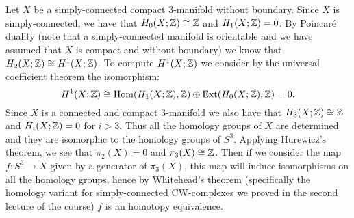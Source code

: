 \documentclass[a4paper,11pt,english]{article}
\begin{document}
\begin{exercise}[2]
Let $X$ be a simply-connected compact 3-manifold without boundary. Since $X$ is simply-connected, we have that $H_0(X;\mathbb{Z})\cong\mathbb{Z}$ and $H_1(X;\mathbb{Z})=0$. By Poincaré duality (note that a simply-connected manifold is orientable and we have assumed that $X$ is compact and without boundary) we know that $H_2(X;\mathbb{Z})\cong H^1(X;\mathbb{Z})$. To compute $H^1(X;\mathbb{Z})$ we consider by the universal coefficient theorem the isomorphism:
\[H^1(X;\mathbb{Z})\cong\operatorname{Hom}(H_1(X;\mathbb{Z}),\mathbb{Z})\oplus\operatorname{Ext}(H_0(X;\mathbb{Z}),\mathbb{Z})=0.\]
Since $X$ is a connected and compact 3-manifold we also have that $H_3(X;\mathbb{Z})\cong\mathbb{Z}$ and $H_i(X;\mathbb{Z})=0$ for $i>3$. Thus all the homology groups of $X$ are determined and they are isomorphic to the homology groups of $S^3$. Applying Hurewicz's theorem, we see that $\pi_2(X)=0$ and $\pi_3(X)\cong\mathbb{Z}$. Then if we consider the map $f:S^3\to X$ given by a generator of $\pi_3(X)$, this map will induce isomorphisms on all the homology groups, hence by Whitehead's theorem (specifically the homology variant for simply-connected CW-complexes we proved in the second lecture of the course) $f$ is an homotopy equivalence.
\end{exercise}
\end{document}
